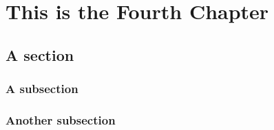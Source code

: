 \documentclass[../ThesisMain]{subfiles}
\begin{document}
\doublespacing%
\chapter{This is the Fourth Chapter}\label{chap:4}
\section{A section}
\subsection{A subsection}
\lipsum[0-1]

\subsection{Another subsection}
\lipsum[0-1]
\end{document}
